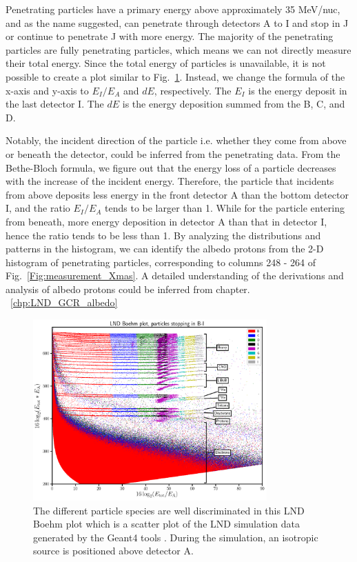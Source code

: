 Penetrating particles have a primary energy above approximately 35 MeV/nuc, and as the name suggested, can penetrate through detectors A to I and stop in J or continue to penetrate J with more energy. The majority of the penetrating particles are fully penetrating particles, which means we can not directly measure their total energy. 
Since the total energy of particles is unavailable, it is not possible to create a plot similar to Fig.~\ref{Fig:LND-Boehm-plot}. Instead, we change the formula of the x-axis and y-axis to $E_I/E_A$ and $dE$, respectively. The $E_I$ is the energy deposit in the last detector I. The $dE$ is the energy deposition summed from the B, C, and D.

Notably, the incident direction of the particle i.e. whether they come from above or beneath the detector, could be inferred from the penetrating data. From the Bethe-Bloch formula, we figure out that the energy loss of a particle decreases with the increase of the incident energy. 
Therefore, the particle that incidents from above deposits less energy in the front detector A than the bottom detector I, and the ratio $E_I/E_A$ tends to be larger than 1. While for the particle entering from beneath, more energy deposition in detector A than that in detector I, hence the ratio tends to be less than 1. 
By analyzing the distributions and patterns in the histogram, we can identify the albedo protons from the 2-D histogram of penetrating particles, corresponding to columns 248 - 264 of Fig.~\ref{Fig:measurement_Xmas}.
A detailed understanding of the derivations and analysis of albedo protons could be inferred from chapter. ~\ref{chp:LND_GCR_albedo}


\begin{figure}
    \centering
    \includegraphics[width=0.8\textwidth]{images/LND_Boehm_plot_isotropic_on_top_of_A_annotated.png}
    \caption[LND Boehm plot of stopping particles based on the simulated data]{The different particle species are well discriminated in this LND Boehm plot which is a scatter plot of the \ac{LND} simulation data generated by the \ac{Geant4} tools \citep{Agostinelli-2003}. During the simulation, an isotropic source is positioned above detector A.}
    \label{Fig:LND-Boehm-plot}
\end{figure}


